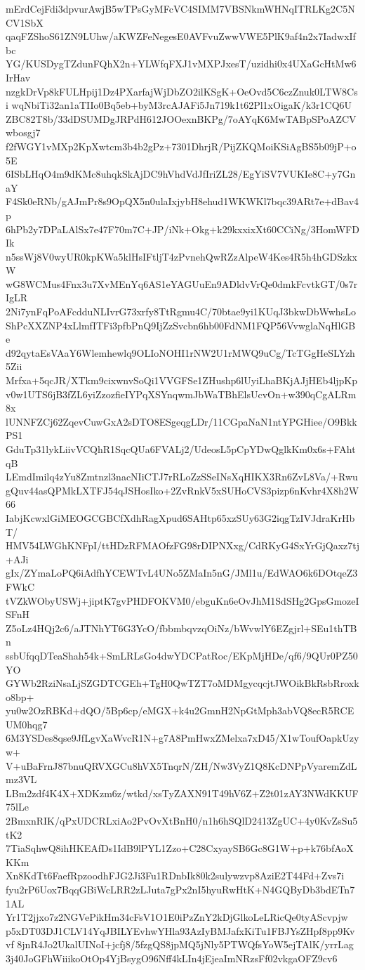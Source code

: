 mErdCejFdi3dpvurAwjB5wTPsGyMFcVC4SIMM7VBSNkmWHNqITRLKg2C5NCV1SbX
qaqFZShoS61ZN9LUhw/aKWZFeNegesE0AVFvuZwwVWE5PlK9af4n2x7IadwxIfbc
YG/KUSDygTZdunFQhX2n+YLWfqFXJ1vMXPJxesT/uzidhi0x4UXaGcHtMw6IrHav
nzgkDrVp8kFULHpij1Dz4PXarfajWjDbZO2ilKSgK+OeOvd5C6czZnuk0LTW8Csi
wqNbiTi32an1aTIIo0Bq5eb+byM3rcAJAFi5Jn719k1t62Pl1xOigaK/k3r1CQ6U
ZBC82T8b/33dDSUMDgJRPdH612JOOexnBKPg/7oAYqK6MwTABpSPoAZCVwbosgj7
f2fWGY1vMXp2KpXwtcm3b4b2gPz+7301DhrjR/PijZKQMoiKSiAgBS5b09jP+o5E
6ISbLHqO4m9dKMc8uhqkSkAjDC9hVhdVdJfIriZL28/EgYiSV7VUKIe8C+y7GnaY
F4Sk0eRNb/gAJmPr8s9OpQX5n0ulaIxjybH8ehud1WKWKl7bqc39ARt7e+dBav4p
6hPb2y7DPaLAlSx7e47F70m7C+JP/iNk+Okg+k29kxxixXt60CCiNg/3HomWFDIk
n5ssWj8V0wyUR0kpKWa5klHsIFtljT4zPvnehQwRZzAlpeW4Kes4R5h4hGDSzkxW
wG8WCMus4Fnx3u7XvMEnYq6AS1eYAGUuEn9ADldvVrQe0dmkFcvtkGT/0s7rIgLR
2Ni7ynFqPoAFcdduNLIvrG73xrfy8TtRgmu4C/70btae9yi1KUqJ3bkwDbWwhsLo
ShPcXXZNP4xLlmfITFi3pfbPnQ9IjZzSvcbn6hb00FdNM1FQP56VvwglaNqHlGBe
d92qytaEsVAaY6Wlemhewlq9OLIoNOHI1rNW2U1rMWQ9uCg/TcTGgHeSLYzh5Zii
Mrfxa+5qcJR/XTkm9cixwnvSoQi1VVGFSe1ZHushp6lUyiLhaBKjAJjHEb4ljpKp
v0w1UTS6jB3fZL6yiZzozfieIYPqXSYnqwmJbWaTBhElsUcvOn+w390qCgALRm8x
lUNNFZCj62ZqevCuwGxA2sDTO8ESgeqgLDr/11CGpaNaN1ntYPGHiee/O9BkkPS1
GduTp31lykLiivVCQhR1SqcQUa6FVALj2/UdeosL5pCpYDwQglkKm0x6s+FAhtqB
LEmdImilq4zYu8Zmtnzl3nacNIiCTJ7rRLoZzSSeINsXqHIKX3Rn6ZvL8Va/+Rwu
gQuv44asQPMkLXTFJ54qJSHosIko+2ZvRnkV5xSUHoCVS3pizp6nKvhr4X8h2W66
IabjKcwxlGiMEOGCGBCfXdhRagXpud6SAHtp65xzSUy63G2iqgTzIVJdraKrHbT/
HMV54LWGhKNFpI/ttHDzRFMAOfzFG98rDIPNXxg/CdRKyG4SxYrGjQaxz7tj+AJi
gIx/ZYmaLoPQ6iAdfhYCEWTvL4UNo5ZMaIn5nG/JMl1u/EdWAO6k6DOtqeZ3FWkC
tVZkWObyUSWj+jiptK7gvPHDFOKVM0/ebguKn6eOvJhM1SdSHg2GpsGmozeISFnH
Z5oLz4HQj2c6/aJTNhYT6G3YcO/fbbmbqvzqOiNz/bWvwlY6EZgjrl+SEu1thTBn
ssbUfqqDTeaShah54k+SmLRLsGo4dwYDCPatRoc/EKpMjHDe/qf6/9QUr0PZ50YO
GYWb2RziNsaLjSZGDTCGEh+TgH0QwTZT7oMDMgycqcjtJWOikBkRsbRroxko8bp+
yu0w2OzRBKd+dQO/5Bp6cp/eMGX+k4u2GmnH2NpGtMph3abVQ8ecR5RCEUM0hqg7
6M3YSDes8qse9JfLgvXaWvcR1N+g7A8PmHwxZMelxa7xD45/X1wToufOapkUzyw+
V+uBaFrnJ87bnuQRVXGCu8hVX5TnqrN/ZH/Nw3VyZ1Q8KcDNPpVyaremZdLmz3VL
LBm2zdf4K4X+XDKzm6z/wtkd/xsTyZAXN91T49hV6Z+Z2t01zAY3NWdKKUF75lLe
2BmxnRIK/qPxUDCRLxiAo2PvOvXtBnH0/n1h6hSQlD2413ZgUC+4y0KvZsSu5tK2
7TiaSqhwQ8ihHKEAfDs1IdB9lPYL1Zzo+C28CxyaySB6Gc8G1W+p+k76bfAoXKKm
Xn8KdTt6FaefRpzoodhFJG2Ji3Fu1RDnbIk80k2sulywzvp8AziE2T44Fd+Zvs7i
fyu2rP6Uox7BqqGBiWcLRR2zLJuta7gPx2nI5hyuRwHtK+N4GQByDb3bdETn71AL
Yr1T2jjxo7z2NGVePikHm34cFsV1O1E0iPzZnY2kDjGlkoLeLRicQe0tyAScvpjw
p5xDT03DJ1CLV14YqJBILYEvhwYHla93AzIyBMJafxKiTu1FBJYsZHpf8pp9Kvvf
8jnR4Jo2UkalUINoI+jcfj8/5fzgQS8jpMQ5jNly5PTWQfsYoW5ejTAlK/yrrLag
3j40JoGFhWiiikoOtOp4YjBsygO96Nff4kLIn4jEjeaImNRzsFf02vkgaOFZ9cv6
